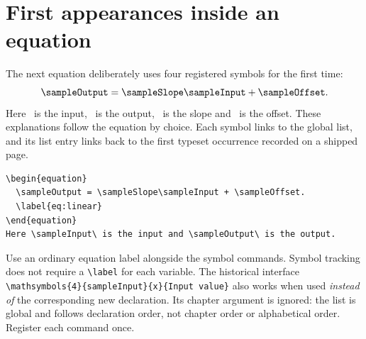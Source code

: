 \section{First appearances inside an equation}
The next equation deliberately uses four registered symbols for the first time:
\begin{equation}
  \sampleOutput = \sampleSlope\sampleInput + \sampleOffset.
  \label{eq:linear}
\end{equation}
Here \sampleInput\ is the input, \sampleOutput\ is the output, \sampleSlope\ is
the slope and \sampleOffset\ is the offset. These explanations follow the
equation by choice. Each symbol links to the global list, and its list entry
links back to the first typeset occurrence recorded on a shipped page.
\begin{lstlisting}
\begin{equation}
  \sampleOutput = \sampleSlope\sampleInput + \sampleOffset.
  \label{eq:linear}
\end{equation}
Here \sampleInput\ is the input and \sampleOutput\ is the output.
\end{lstlisting}
Use an ordinary equation label alongside the symbol commands. Symbol tracking
does not require a \verb|\label| for each variable. The historical interface
\verb|\mathsymbols{4}{sampleInput}{x}{Input value}| also works when used
\emph{instead of} the corresponding new declaration. Its chapter argument is
ignored: the list is global and follows declaration order, not chapter order
or alphabetical order. Register each command once.

